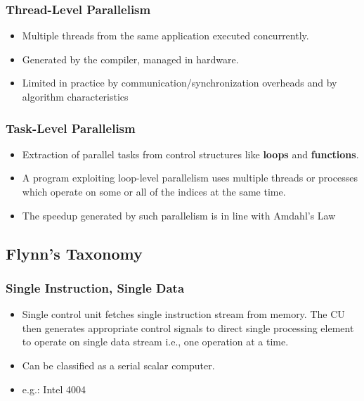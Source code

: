 \documentclass{article}
\begin{document}
\subsubsection{Thread-Level Parallelism}
\begin{itemize}
    \item Multiple threads from the same application executed concurrently.
    
    \item Generated by the compiler, managed in hardware. 
    
    \item Limited in practice by communication/synchronization overheads and by algorithm characteristics
\end{itemize}

\subsubsection{Task-Level Parallelism}
\begin{itemize}
    \item Extraction of parallel tasks from control structures like \textbf{loops} and \textbf{functions}.
    
    \item A program exploiting loop-level parallelism uses multiple threads or processes which operate on some or all of the indices at the same time. 
    
    \item The speedup generated by such parallelism is in line with Amdahl's Law
\end{itemize}

\subsection{Flynn's Taxonomy}
\subsubsection{Single Instruction, Single Data}
\begin{itemize}
    \item Single control unit fetches single instruction stream from memory. The CU then generates appropriate control signals to direct single processing element to operate on single data stream i.e., one operation at a time.
    
    \item Can be classified as a serial scalar computer. 
    
    \item e.g.: Intel 4004
\end{itemize}
\end{document}
